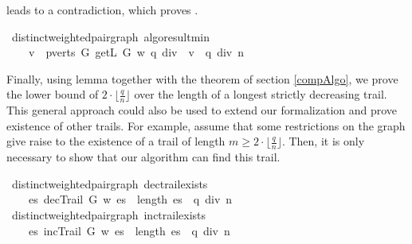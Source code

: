 \begin{isabellebody}
\begin{isamarkuptext}
leads to a contradiction, which proves .%
\end{isamarkuptext}\isamarkuptrue%
\isamarkupfalse%
{\isacharparenleft}\ distinct{\isacharunderscore}weighted{\isacharunderscore}pair{\isacharunderscore}graph{\isacharparenright}\ algo{\isacharunderscore}result{\isacharunderscore}min{\isacharcolon}\ \isanewline
\ \ \ {\isachardoublequoteopen}{\isacharparenleft}{\isasymexists}\ v\ {\isasymin}\ pverts\ G{\isachardot}\ getL\ G\ w\ {\isacharparenleft}q\ div\ {}{\isacharparenright}\ v\ {\isasymge}\ q\ div\ n{\isacharparenright}{\isachardoublequoteclose}%
\isadelimproof
%
\endisadelimproof
%
\isatagproof
%
\endisatagproof
{\isafoldproof}%
%
\isadelimproof
%
\endisadelimproof
%
\begin{isamarkuptext}%
Finally, using lemma  together with the  theorem 
of section \ref{compAlgo}, we prove the lower bound of $2\cdot\lfloor \frac{q}{n} \rfloor$ over the length 
of a longest strictly decreasing trail. This general approach could also be used to extend our
formalization and prove existence of other trails. For example, assume that some restrictions on the graph 
give raise to the existence of a trail of length $m \ge 2\cdot\lfloor \frac{q}{n} \rfloor$. Then, it is
only necessary to show that our algorithm can find this trail.%
\end{isamarkuptext}\isamarkuptrue%
\isamarkupfalse%
{\isacharparenleft}\ distinct{\isacharunderscore}weighted{\isacharunderscore}pair{\isacharunderscore}graph{\isacharparenright}\ dec{\isacharunderscore}trail{\isacharunderscore}exists{\isacharcolon}\ \isanewline
\ \ \ {\isachardoublequoteopen}{\isasymexists}\ es{\isachardot}\ decTrail\ G\ w\ es\ {\isasymand}\ length\ es\ {\isacharequal}\ q\ div\ n{\isachardoublequoteclose}%
\isadelimproof
%
\endisadelimproof
%
\isatagproof
%
\endisatagproof
{\isafoldproof}%
%
\isadelimproof
%
\endisadelimproof
\isanewline
\isanewline
{}\isamarkupfalse%
{\isacharparenleft}\ distinct{\isacharunderscore}weighted{\isacharunderscore}pair{\isacharunderscore}graph{\isacharparenright}\ inc{\isacharunderscore}trail{\isacharunderscore}exists{\isacharcolon}\ \isanewline
\ \ \ {\isachardoublequoteopen}{\isasymexists}\ es{\isachardot}\ incTrail\ G\ w\ es\ {\isasymand}\ length\ es\ {\isacharequal}\ q\ div\ n{\isachardoublequoteclose}\isanewline

\end{isabellebody}
